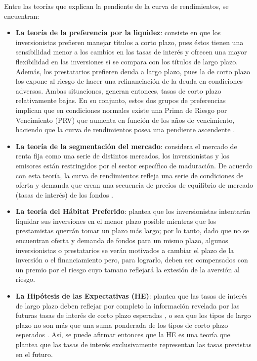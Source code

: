 \documentclass[
  12pt,
]{krantz}
\begin{document}
Entre las teorías que explican la pendiente de la curva de rendimientos, se encuentran:

\begin{itemize}
\item
  \textbf{La teoría de la preferencia por la liquidez}: consiste en que los inversionistas prefieren manejar títulos a corto plazo, pues éstos tienen una sensibilidad menor a los cambios en las tasas de interés y ofrecen una mayor flexibilidad en las inversiones si se compara con los títulos de largo plazo. Además, los prestatarios prefieren deuda a largo plazo, pues la de corto plazo los expone al riesgo de hacer una refinanciación de la deuda en condiciones adversas. Ambas situaciones, generan entonces, tasas de corto plazo relativamente bajas. En su conjunto, estos dos grupos de preferencias implican que en condiciones normales existe una Prima de Riesgo por Vencimiento (PRV) que aumenta en función de los años de vencimiento, haciendo que la curva de rendimientos posea una pendiente ascendente \cite{DO}.
\item
  \textbf{La teoría de la segmentación del mercado}: considera el mercado de renta fija como una serie de distintos mercados, los inversionistas y los emisores están restringidos por el sector específico de maduración. De acuerdo con esta teoría, la curva de rendimientos refleja una serie de condiciones de oferta y demanda que crean una secuencia de precios de equilibrio de mercado (tasas de interés) de los fondos \cite{DO}.
\item
  \textbf{La teoría del Hábitat Preferido}: plantea que los inversionistas intentarán liquidar sus inversiones en el menor plazo posible mientras que los prestamistas querrán tomar un plazo más largo; por lo tanto, dado que no se encuentran oferta y demanda de fondos para un mismo plazo, algunos inversionistas o prestatarios se verán motivados a cambiar el plazo de la inversión o el financiamiento pero, para lograrlo, deben ser compensados con un premio por el riesgo cuyo tamano reflejará la extesión de la aversión al riesgo.
\item
  \textbf{La Hipótesis de las Expectativas (HE)}: plantea que las tasas de interés de largo plazo deben reflejar por completo la información revelada por las futuras tasas de interés de corto plazo esperadas \cite{YS}, o sea que los tipos de largo plazo no son más que una suma ponderada de los tipos de corto plazo esperados \cite{FR}. Así, se puede afirmar entonces que la HE es una teoría que plantea que las tasas de interés exclusivamente representan las tasas previstas en el futuro.
\end{itemize}
\end{document}
